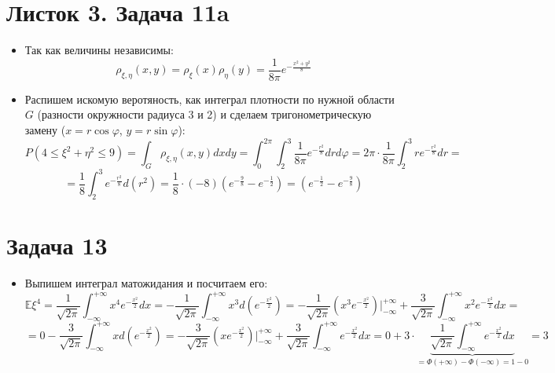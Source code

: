\section{Листок 3. Задача 11a}
\begin{itemize}
\item Так как величины независимы:
\[
    \rho_{\xi, \eta}\left(x, y\right) = \rho_{\xi}\left(x\right) \rho_{\eta}\left(y\right) = \frac 1 {8 \pi} e ^ {-\frac{x ^ 2 + y ^ 2}{8}}
\]
\item Распишем искомую веротяность, как интеграл плотности по нужной области $G$ (разности окружности радиуса 3 и 2) и сделаем тригонометрическую замену ($x = r \cos \varphi$, $y = r \sin \varphi$):
\[
    P\left(4 \leq \xi ^ 2 + \eta ^ 2 \leq 9\right) = \int_{G} \rho_{\xi, \eta}\left(x, y\right) dxdy = \int_{0}^{2 \pi} \int_{2}^{3} \frac 1{8 \pi} e ^ {-\frac{r ^ 2}{8}} dr d \varphi = 2 \pi \cdot \frac 1 {8\pi} \int_{2}^{3} r e ^ {-\frac{r ^ 2}{8}}dr = 
\]
\[
    =  \frac{1}{8} \int_{2}^{3} e ^ {-\frac{r ^ 2}{8}} d\left(r ^ 2\right) = \frac1 8 \cdot \left(-8\right) \left(e ^ {-\frac 9 8} - e ^ {- \frac 1 2}\right) =  \left(e ^ {- \frac 1 2} - e ^ {-\frac 9 8}\right)
\]

\end{itemize}

\section{Задача 13}

\begin{itemize}
\item Выпишем интеграл матожидания и посчитаем его:
\[
    \mathbb{E} \xi ^ 4 = \frac {1}{\sqrt{2 \pi}} \int_{-\infty}^{+\infty} x ^ 4 e ^ {-\frac{x ^ 2}{2}} dx = 
    -\frac{1}{\sqrt{2 \pi}} \int_{-\infty}^{+\infty} x ^ 3 d \left(e ^ {-\frac{x ^ 2}{2}}\right) = 
    -\frac{1}{\sqrt{2 \pi}} \left(x ^ 3 e ^ {-\frac{x ^ 2}{2}}\right)\Big|_{-\infty}^{+\infty} + \frac{3}{\sqrt{2\pi}} \int_{-\infty}^{+\infty} x ^ 2 e ^ {-\frac{x ^ 2}{2}} dx = 
\]
\[
    = 0 - \frac{3}{\sqrt{2 \pi}} \int_{-\infty}^{+\infty} x d\left(e ^ {-\frac{x ^ 2}{2}}\right) = 
    -\frac{3}{\sqrt{2 \pi}} \left(x e ^ {-\frac{x ^ 2}{2}}\right)\Big|_{-\infty}^{+\infty} + \frac{3}{\sqrt{2 \pi}} \int_{-\infty}^{+\infty} e ^ {-\frac{x ^ 2}{2}} dx =
    0 + 3 \cdot \underbrace{\frac{1}{\sqrt{2 \pi}} \int_{-\infty}^{+\infty} e ^ {-\frac{x ^ 2}{2}}dx}_{= \Phi\left(+\infty\right) - \Phi\left(- \infty\right) = 1 - 0} = 3 
\]
\end{itemize}

